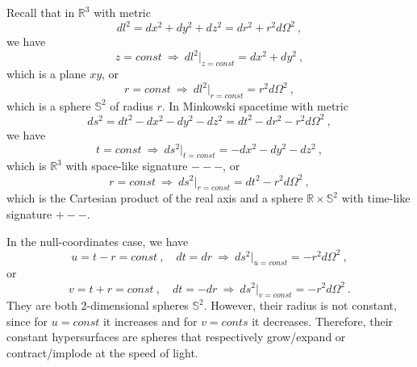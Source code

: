     Recall that in $\mathbb R^3$ with metric 
    \begin{equation*}
        dl^2 = dx^2 +  dy^2 + dz^2 = dr^2 + r^2 d\Omega^2 ~,
    \end{equation*}
    we have
    \begin{equation*}
        z = const ~ \Rightarrow ~ dl^2 \vert_{z = const} = dx^2 + dy^2 ~,
    \end{equation*}
    which is a plane $xy$, or 
    \begin{equation*}
        r = const ~ \Rightarrow ~ dl^2 \vert_{r = const} = r^2 d\Omega^2 ~,
    \end{equation*}
    which is a sphere $\mathbb S^2$ of radius $r$. In Minkowski spacetime with metric 
    \begin{equation*}
        ds^2 = dt^2 - dx^2 - dy^2 - dz^2 = dt^2 - dr^2 - r^2 d\Omega^2 ~,
    \end{equation*}
    we have
    \begin{equation*}
        t = const ~ \Rightarrow ~ ds^2 \vert_{t = const} = - dx^2 - dy^2 - dz^2 ~,
    \end{equation*}
    which is $\mathbb R^3$ with space-like signature $---$, or 
    \begin{equation*}
        r = const ~ \Rightarrow ~ ds^2 \vert_{r = const} = dt^2 - r^2 d\Omega^2 ~,
    \end{equation*}
    which is the Cartesian product of the real axis and a sphere $\mathbb R \times \mathbb S^2$ with time-like signature $+--$.

    In the null-coordinates case, we have 
    \begin{equation*}
        u = t - r = const ~, \quad dt = dr ~ \Rightarrow ~ ds^2 \vert_{u = const} = - r^2 d\Omega^2 ~,
    \end{equation*}
    or 
    \begin{equation*}
        v = t + r = const ~, \quad dt = - dr ~ \Rightarrow ~ ds^2 \vert_{v = const} = - r^2 d\Omega^2 ~.
    \end{equation*}
    They are both $2$-dimensional spheres $\mathbb S^2$. However, their radius is not constant, since for $u = const$ it increases and for $v = conts$ it decreases. Therefore, their constant hypersurfaces are spheres that respectively grow/expand or contract/implode at the speed of light.

